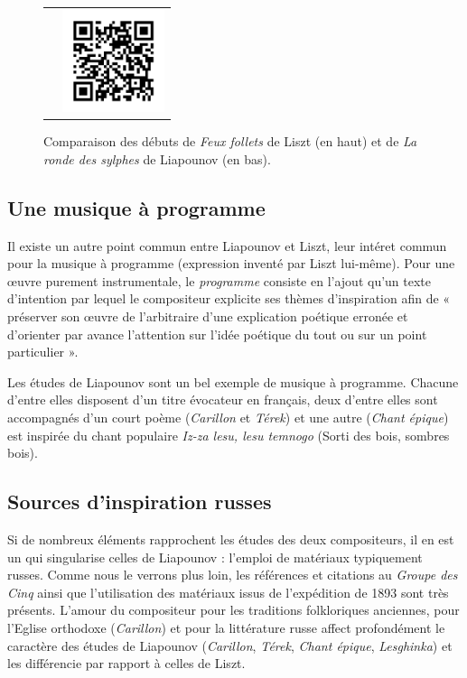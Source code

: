 \begin{figure}[!p]
\begin{bigcenter}
\begin{tabular}{lr}
      &
      \includegraphics[width=3cm, keepaspectratio]{op11-xi-qr.png}
    \end{tabular}
  \end{bigcenter}
  \caption{\label{op11-xi}Comparaison des débuts de \emph{Feux follets} de Liszt (en haut) et de \emph{La ronde des sylphes} de Liapounov (en bas).}
\end{figure}

\subsection{Une musique à programme}

Il existe un autre point commun entre Liapounov et Liszt, leur intéret commun pour la musique à programme (expression inventé par Liszt lui-même). Pour une œuvre purement instrumentale, le \emph{programme} consiste en l'ajout qu'un texte d'intention par lequel le compositeur explicite ses thèmes d'inspiration afin de « préserver son œuvre de l'arbitraire d'une explication poétique erronée et d'orienter par avance l'attention sur l'idée poétique du tout ou sur un point particulier ».

Les études de Liapounov sont un bel exemple de musique à programme. Chacune d'entre elles disposent d'un titre évocateur en français, deux d'entre elles sont accompagnés d'un court poème (\emph{Carillon} et \emph{Térek}) et une autre (\emph{Chant épique}) est inspirée du chant populaire \emph{Iz-za lesu, lesu temnogo} (Sorti des bois, sombres bois). 

\subsection{Sources d'inspiration russes}

Si de nombreux éléments rapprochent les études des deux compositeurs, il en est un qui singularise celles de Liapounov : l’emploi de matériaux typiquement russes. Comme nous le verrons plus loin, les références et citations au \emph{Groupe des Cinq} ainsi que l'utilisation des matériaux issus de l'expédition de 1893 sont très présents. L'amour du compositeur pour les traditions folkloriques anciennes, pour l'Eglise orthodoxe (\emph{Carillon}) et pour la littérature russe affect profondément le caractère des études de Liapounov (\emph{Carillon}, \emph{Térek}, \emph{Chant épique}, \emph{Lesghinka}) et les différencie par rapport à celles de Liszt.

